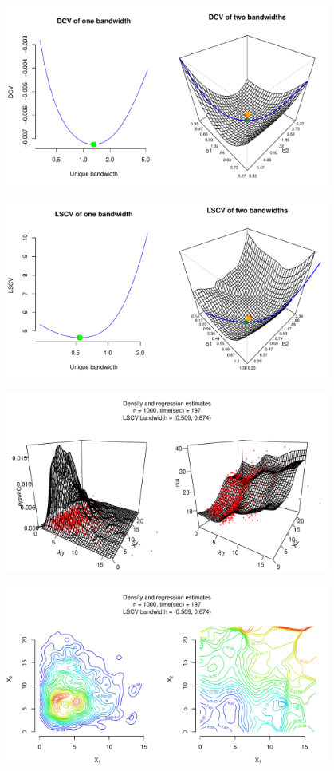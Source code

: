 \documentclass[11pt, a4paper]{article}
\begin{document}
\begin{center}
	\includegraphics[width=0.8\textwidth]{output/24-DCV-3D.pdf}
	
	\includegraphics[width=0.8\textwidth]{output/25-LSCV-3D.pdf}
	
	\includegraphics[width=0.8\textwidth]{output/26-density-and-regression-multi.pdf}
	
	\includegraphics[width=0.8\textwidth]{output/27-density-and-regression-multi-levels.pdf}
\end{center}
\end{document}
